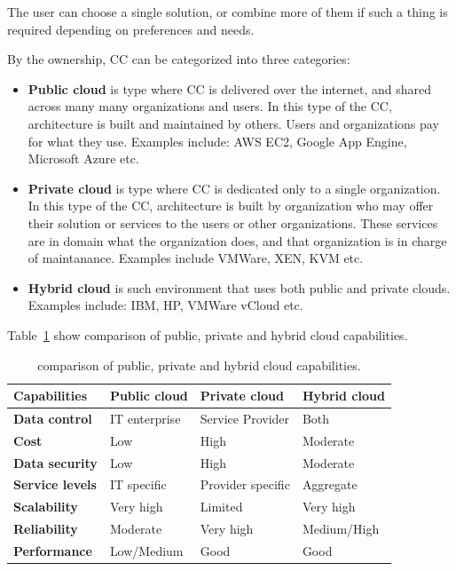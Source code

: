 The user can choose a single solution, or combine more of them if such a thing is required depending on preferences and needs.

By the ownership, CC can be categorized into three categories:

\begin{itemize}
	\item \textbf{Public cloud} is type where CC is delivered over the internet, and shared across many many organizations and users. In this type of the CC, architecture is built and maintained by others. Users and organizations pay for what they use. Examples include: AWS EC2, Google App Engine, Microsoft Azure etc.
	\item \textbf{Private cloud} is type where CC is dedicated only to a single organization. In this type of the CC, architecture is built by organization who may offer their solution or services to the users or other organizations. These services are in domain what the organization does, and that organization is in charge of maintanance. Examples include VMWare, XEN, KVM etc.
	\item \textbf{Hybrid cloud} is such environment that uses both public and private clouds. Examples include: IBM, HP, VMWare vCloud etc.
\end{itemize}

Table~\ref{tab:table4} show comparison of public, private and hybrid cloud capabilities.

\begin{table}[h!]
	\begin{center}
		\begin{tabular}{l|l|l|l}
			\textbf{Capabilities} & \textbf{Public cloud} & \textbf{Private cloud} & \textbf{Hybrid cloud}\\
			\hline
			\textbf{Data control} & IT enterprise & Service Provider & Both \\
			\textbf{Cost} & Low & High & Moderate \\
			\textbf{Data security} & Low & High & Moderate \\
			\textbf{Service levels} & IT specific & Provider specific & Aggregate \\
			\textbf{Scalability} & Very high & Limited & Very high \\	
			\textbf{Reliability} & Moderate & Very high & Medium/High\\	
			\textbf{Performance} & Low/Medium & Good & Good \\
\end{tabular}
	\end{center}
	\vspace{-0.5cm}
	\caption{comparison of public, private and hybrid cloud capabilities.}
	\label{tab:table4}
\end{table}

